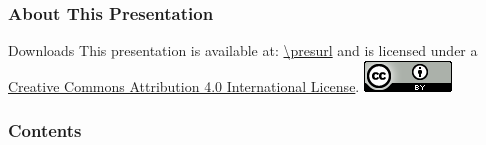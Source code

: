 \frame{\maketitle}

\setcounter{footnote}{0}


\begin{frame}
\frametitle{About This Presentation}
 \begin{block}{Downloads}
  This presentation is available at: \url{\presurl} and is 
  licensed under a 
  \href{http://creativecommons.org/licenses/by/4.0/}{Creative Commons 
Attribution 4.0 International License}. \includegraphics[scale=.5]{pics/cc.png}

 \end{block}
\end{frame}



\begin{frame}
\frametitle{Contents}
\small
\tableofcontents[hideallsubsections]
\end{frame}

\setcounter{framenumber}{0}